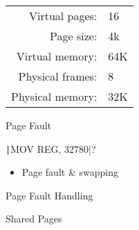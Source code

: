\begin{frame}
  \begin{minipage}{.55\textwidth}
    \label{fig:paging}
  \end{minipage}\hfill
  \begin{minipage}{.4\textwidth}
    \begin{tabular}{rl}
      Virtual pages:  &16\\
      Page size:      &4k\\
      Virtual memory: & 64K\\
      Physical frames:&8\\
      Physical memory:&32K
    \end{tabular}
  \end{minipage}
\end{frame}

\begin{frame}[fragile]{Page Fault}
  \begin{minipage}{.4\textwidth}
    \centering
  \end{minipage}\hfill
  \begin{minipage}{.48\textwidth}
    \texttt|MOV REG, 32780|?
    \begin{itemize}
    \item[\Symbol{➠}] Page fault \& swapping
    \end{itemize}
  \end{minipage}
\end{frame}

\begin{frame}{Page Fault Handling}
  \centering
  \mode<beamer>{ \texttt{[image: osc-9-14]} }%
\end{frame}

\begin{frame}{Shared Pages}
  \centering
  \mode<beamer>{ \texttt{[image: osc-8-33]} }%
\end{frame}

